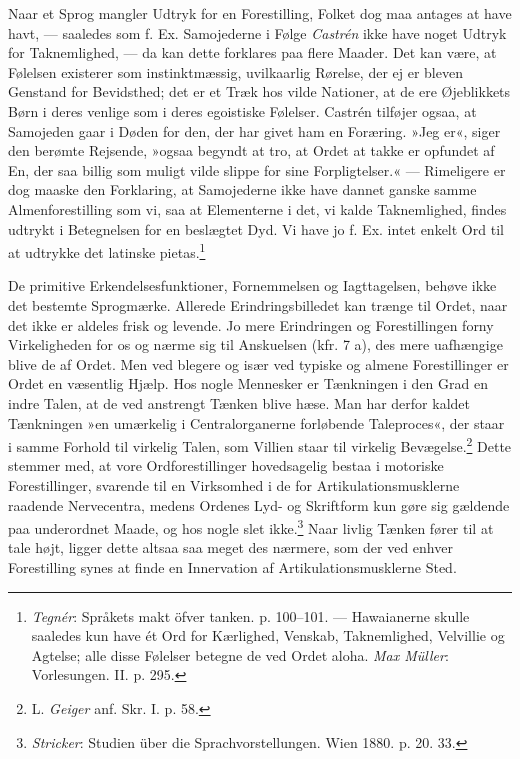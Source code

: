 \documentclass[12pt,a4paper,openany]{book}
\newcommand{\opage}[1]{\marginnote{\footnotesize\textit{[#1]}}}
\begin{document}
Naar et Sprog mangler Udtryk for en Forestilling, Folket dog maa antages
at have havt, --- saaledes som f. Ex. Samojederne i Følge \emph{Castrén}
ikke have noget Udtryk for Taknemlighed, --- da kan dette forklares paa
flere Maader. Det kan være, at Følelsen existerer som instinktmæssig,
uvilkaarlig Rørelse, der ej er bleven Genstand for Bevidsthed; det er et
Træk hos vilde Nationer, at de ere Øjeblikkets Børn i deres venlige som
i deres egoistiske Følelser. Castrén tilføjer ogsaa, at Samojeden gaar i
Døden for den, der har givet ham en Foræring. »Jeg er«, siger den
berømte Rejsende, »ogsaa begyndt at tro, at Ordet at takke er opfundet
af En, der saa billig som muligt vilde slippe for sine Forpligtelser.«
--- Rimeligere er dog maaske den Forklaring, at Samojederne ikke have
dannet ganske samme Almenforestilling som vi, saa at Elementerne i det,
vi kalde Taknemlighed, findes udtrykt i Betegnelsen for en beslægtet
Dyd. Vi have jo f. Ex. intet enkelt Ord til at udtrykke det latinske
pietas.\footnote[2]{\emph{Tegnér}: Språkets makt öfver tanken. p.
100--101. --- Hawaianerne skulle saaledes kun have ét Ord for Kærlighed,
Venskab, Taknemlighed, Velvillie og Agtelse; alle disse Følelser betegne
de ved Ordet aloha. \emph{Max Müller}: Vorlesungen. II. p. 295.}

De primitive Erkendelsesfunktioner, Fornemmelsen og Iagttagelsen, behøve
ikke det bestemte Sprogmærke. Allerede
\opage{208}Erindringsbilledet kan trænge til Ordet, naar det ikke er
aldeles frisk og levende. Jo mere Erindringen og Forestillingen forny
Virkeligheden for os og nærme sig til Anskuelsen (kfr. 7 a), des mere
uafhængige blive de af Ordet. Men ved blegere og især ved typiske og
almene Forestillinger er Ordet en væsentlig Hjælp. Hos nogle Mennesker
er Tænkningen i den Grad en indre Talen, at de ved anstrengt Tænken
blive hæse. Man har derfor kaldet Tænkningen »en umærkelig i
Centralorganerne forløbende Taleproces«, der staar i samme Forhold til
virkelig Talen, som Villien staar til virkelig Bevægelse.\footnote[1]{L.
\emph{Geiger} anf. Skr. I. p. 58.} Dette stemmer med, at vore
Ordforestillinger hovedsagelig bestaa i motoriske Forestillinger,
svarende til en Virksomhed i de for Artikulationsmusklerne raadende
Nervecentra, medens Ordenes Lyd- og Skriftform kun gøre sig gældende paa
underordnet Maade, og hos nogle slet ikke.\footnote[2]{\emph{Stricker}:
Studien über die Sprachvorstellungen. Wien 1880. p. 20. 33.} Naar livlig
Tænken fører til at tale højt, ligger dette altsaa saa meget des
nærmere, som der ved enhver Forestilling synes at finde en Innervation
af Artikulationsmusklerne Sted.
\end{document}
